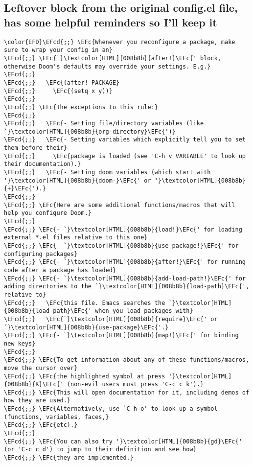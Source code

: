 \documentclass{article}
\newcommand{\EFc}[1]{\textcolor{EFc}{#1}} %
\newcommand{\EFcd}[1]{\textcolor{EFcd}{#1}} %
\begin{document}
\subsection{Leftover block from the original config.el file, has some helpful reminders so I'll keep it}
\label{sec:org84cad1d}
\begin{Code}
\begin{Verbatim}
\color{EFD}\EFcd{;;} \EFc{Whenever you reconfigure a package, make sure to wrap your config in an}
\EFcd{;;} \EFc{`}\textcolor[HTML]{008b8b}{after!}\EFc{' block, otherwise Doom's defaults may override your settings. E.g.}
\EFcd{;;}
\EFcd{;;}   \EFc{(after! PACKAGE}
\EFcd{;;}     \EFc{(setq x y))}
\EFcd{;;}
\EFcd{;;} \EFc{The exceptions to this rule:}
\EFcd{;;}
\EFcd{;;}   \EFc{- Setting file/directory variables (like `}\textcolor[HTML]{008b8b}{org-directory}\EFc{')}
\EFcd{;;}   \EFc{- Setting variables which explicitly tell you to set them before their}
\EFcd{;;}     \EFc{package is loaded (see 'C-h v VARIABLE' to look up their documentation).}
\EFcd{;;}   \EFc{- Setting doom variables (which start with '}\textcolor[HTML]{008b8b}{doom-}\EFc{' or '}\textcolor[HTML]{008b8b}{+}\EFc{').}
\EFcd{;;}
\EFcd{;;} \EFc{Here are some additional functions/macros that will help you configure Doom.}
\EFcd{;;}
\EFcd{;;} \EFc{- `}\textcolor[HTML]{008b8b}{load!}\EFc{' for loading external *.el files relative to this one}
\EFcd{;;} \EFc{- `}\textcolor[HTML]{008b8b}{use-package!}\EFc{' for configuring packages}
\EFcd{;;} \EFc{- `}\textcolor[HTML]{008b8b}{after!}\EFc{' for running code after a package has loaded}
\EFcd{;;} \EFc{- `}\textcolor[HTML]{008b8b}{add-load-path!}\EFc{' for adding directories to the `}\textcolor[HTML]{008b8b}{load-path}\EFc{', relative to}
\EFcd{;;}   \EFc{this file. Emacs searches the `}\textcolor[HTML]{008b8b}{load-path}\EFc{' when you load packages with}
\EFcd{;;}   \EFc{`}\textcolor[HTML]{008b8b}{require}\EFc{' or `}\textcolor[HTML]{008b8b}{use-package}\EFc{'.}
\EFcd{;;} \EFc{- `}\textcolor[HTML]{008b8b}{map!}\EFc{' for binding new keys}
\EFcd{;;}
\EFcd{;;} \EFc{To get information about any of these functions/macros, move the cursor over}
\EFcd{;;} \EFc{the highlighted symbol at press '}\textcolor[HTML]{008b8b}{K}\EFc{' (non-evil users must press 'C-c c k').}
\EFcd{;;} \EFc{This will open documentation for it, including demos of how they are used.}
\EFcd{;;} \EFc{Alternatively, use `C-h o' to look up a symbol (functions, variables, faces,}
\EFcd{;;} \EFc{etc).}
\EFcd{;;}
\EFcd{;;} \EFc{You can also try '}\textcolor[HTML]{008b8b}{gd}\EFc{' (or 'C-c c d') to jump to their definition and see how}
\EFcd{;;} \EFc{they are implemented.}
\end{Verbatim}
\end{Code}
\end{document}
